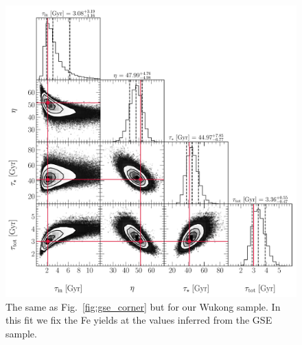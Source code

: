 \documentclass[ms.tex]{subfiles}
\begin{document}
\begin{figure}
\centering
\includegraphics[scale = 0.52]{wukong_512k.pdf}
\caption{
The same as Fig.~\ref{fig:gse_corner} but for our Wukong sample.
In this fit we fix the Fe yields at the values inferred from the GSE sample.
}
\label{fig:wukong_corner}
\end{figure}
\end{document}
